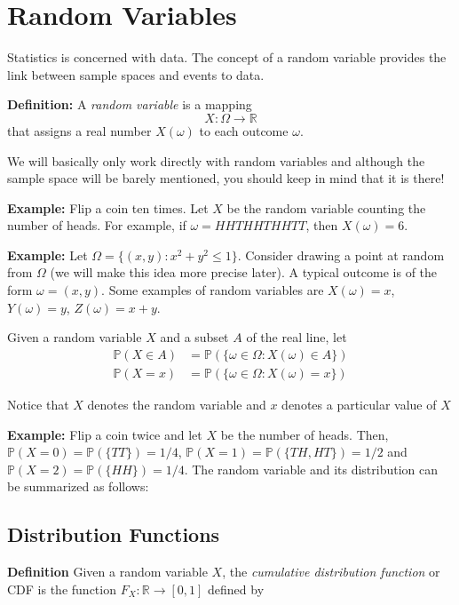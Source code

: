 \documentclass[
]{book}
\theoremstyle{definition}
\theoremstyle{definition}
\theoremstyle{definition}
\theoremstyle{definition}
\theoremstyle{remark}
\begin{document}
\hypertarget{random-variables}{%
\section{Random Variables}\label{random-variables}}

Statistics is concerned with data. The concept of a random variable provides the link between sample spaces and events to data.

\textbf{Definition:} A \emph{random variable} is a mapping
\[
X: \Omega \rightarrow \mathbb{R}
\]
that assigns a real number \(X(\omega)\) to each outcome \(\omega\).

We will basically only work directly with random variables and although the sample space will be barely mentioned, you should keep in mind that it is there!

\textbf{Example:} Flip a coin ten times. Let \(X\) be the random variable counting the number of heads. For example, if \(\omega= HHTHHTHHTT\), then \(X(\omega)=6\).

\textbf{Example:} Let \(\Omega=\{(x,y): x^2+y^2 \leq 1\}\). Consider drawing a point at random from \(\Omega\) (we will make this idea more precise later). A typical outcome is of the form \(\omega=(x,y)\). Some examples of random variables are \(X(\omega)=x\), \(Y(\omega)=y\), \(Z(\omega)=x+y\).

Given a random variable \(X\) and a subset \(A\) of the real line, let
\begin{align}
\mathbb{P}(X\in A) &= \mathbb{P}(\{\omega\in\Omega: X(\omega)\in A\})\\
\mathbb{P}(X = x) &= \mathbb{P}(\{\omega\in\Omega: X(\omega)=x\})
\end{align}

Notice that \(X\) denotes the random variable and \(x\) denotes a particular value of \(X\)

\textbf{Example:} Flip a coin twice and let \(X\) be the number of heads. Then, \(\mathbb{P}(X=0)=\mathbb{P}(\{TT\})=1/4\), \(\mathbb{P}(X=1)=\mathbb{P}(\{TH,HT\})=1/2\) and \(\mathbb{P}(X=2)=\mathbb{P}(\{HH\})=1/4\). The random variable and its distribution can be summarized as follows:

\hypertarget{distribution-functions}{%
\subsection{Distribution Functions}\label{distribution-functions}}

\textbf{Definition} Given a random variable \(X\), the \emph{cumulative distribution function} or CDF is the function \(F_X:\mathbb{R}\rightarrow [0,1]\) defined by
\end{document}
